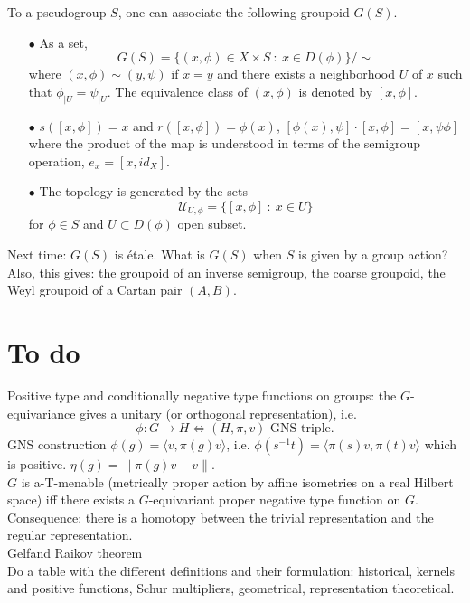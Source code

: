 To a pseudogroup $S$, one can associate the following groupoid $G(S)$.
\begin{itemize}
\item[$\bullet$] As a set, \[G(S) = \{(x,\phi)\in X\times S \ : \ x\in D(\phi)\} / \sim\]
where $(x,\phi)\sim (y,\psi)$ if $x=y$ and there exists a neighborhood $U$ of $x$ such that $\phi_{|U}=\psi_{|U}$. The equivalence class of $(x,\phi)$ is denoted by $[x,\phi]$.
\item[$\bullet$] $s([x,\phi]) = x$ and $r([x,\phi]) = \phi(x)$, $[\phi(x),\psi]\cdot [x,\phi] = [x, \psi\phi]$ where the product of the map is understood in terms of the semigroup operation, $e_x = [x,id_X]$.
\item[$\bullet$] The topology is generated by the sets
\[\mathcal U_{U, \phi} = \{[x,\phi] \ : \ x\in U \}\]
for $\phi\in S$ and $U\subset D(\phi)$ open subset.
\end{itemize} 

Next time: $G(S)$ is \'etale. What is $G(S)$ when $S$ is given by a group action? Also, this gives: the groupoid of an inverse semigroup, the coarse groupoid, the Weyl groupoid of a Cartan pair $(A,B)$.

\section{To do}
Positive type and conditionally negative type functions on groups: the $G$-equivariance gives a unitary (or orthogonal representation), i.e.
\[\phi: G\rightarrow H \iff (H,\pi,v) \text{ GNS triple}.\] 
GNS construction $\phi(g) = \langle v,\pi(g)v\rangle$, i.e. $\phi(s^{-1}t) = \langle \pi(s)v,\pi(t)v\rangle$ which is positive. $\eta(g)= \|\pi(g)v -v\|$. \\

$G$ is a-T-menable (metrically proper action by affine isometries on a real Hilbert space) iff there exists a $G$-equivariant proper negative type function on $G$.\\

Consequence: there is a homotopy between the trivial representation and the regular representation.\\

Gelfand Raikov theorem\\

Do a table with the different definitions and their formulation: historical, kernels and positive functions, Schur multipliers, geometrical, representation theoretical.

\newpage

